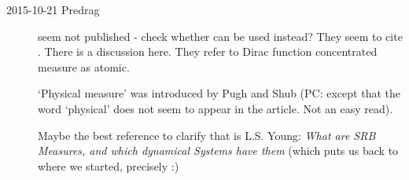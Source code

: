 \begin{description}

\item[2015-10-21 Predrag]
 seem not published - check whether
 can be used instead? They seem to cite
. There is a discussion
{here}. They refer to Dirac function concentrated measure  as atomic.

`Physical measure' was introduced by Pugh and Shub (PC:
except that the word `physical' does not seem to appear in the article.
Not an easy read).

Maybe the best reference to clarify that is L.S. Young:
\emph{What are SRB Measures, and which dynamical Systems have them}
(which puts us back to where we started, precisely :)



\end{description}
